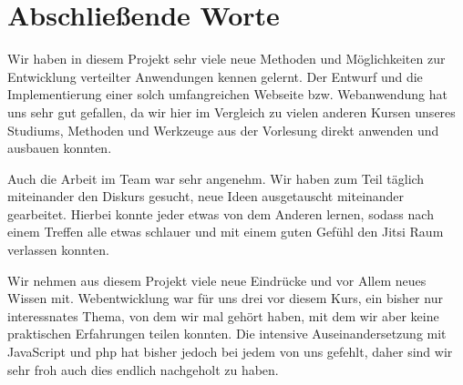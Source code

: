 \chapter{Abschließende Worte}
\label{sec:zusammenfassung}

Wir haben in diesem Projekt sehr viele neue Methoden und Möglichkeiten zur
Entwicklung verteilter Anwendungen kennen gelernt. Der Entwurf und
die Implementierung einer solch umfangreichen Webseite bzw. Webanwendung
hat uns sehr gut gefallen, da wir hier im Vergleich zu vielen anderen Kursen
unseres Studiums, Methoden und Werkzeuge aus der Vorlesung direkt anwenden
und ausbauen konnten.

Auch die Arbeit im Team war sehr angenehm. Wir haben zum Teil täglich miteinander
den Diskurs gesucht, neue Ideen ausgetauscht miteinander gearbeitet. Hierbei konnte
jeder etwas von dem Anderen lernen, sodass nach einem Treffen alle etwas schlauer
und mit einem guten Gefühl den Jitsi Raum verlassen konnten.

Wir nehmen aus diesem Projekt viele neue Eindrücke und vor Allem neues Wissen mit.
Webentwicklung war für uns drei vor diesem Kurs, ein bisher \frqq{}nur\flqq{}
interessnates Thema, von dem wir mal gehört haben, mit dem wir aber keine praktischen
Erfahrungen teilen konnten. Die intensive Auseinandersetzung mit JavaScript und php
hat bisher jedoch bei jedem von uns gefehlt, daher sind wir sehr froh auch dies endlich
nachgeholt zu haben.


